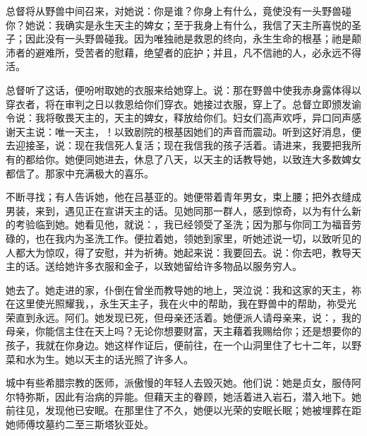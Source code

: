 总督将从野兽中间召来，对她说：你是谁？你身上有什么，竟使没有一头野兽碰你？她说：我确实是永生天主的婢女；至于我身上有什么，我信了天主所喜悦的圣子；因此没有一头野兽碰我。因为唯独祂是救恩的终向，永生生命的根基；祂是颠沛者的避难所，受苦者的慰藉，绝望者的庇护；并且，凡不信祂的人，必永远不得活。\par

总督听了这话，便吩咐取她的衣服来给她穿上。说：那在野兽中使我赤身露体得以穿衣者，将在审判之日以救恩给你们穿衣。她接过衣服，穿上了。总督立即颁发谕令说：我将敬畏天主的，天主的婢女，释放给你们。妇女们高声欢呼，异口同声感谢天主说：唯一天主，！以致剧院的根基因她们的声音而震动。听到这好消息，便去迎接圣，说：现在我信死人复活；现在我信我的孩子活着。请进来，我要把我所有的都给你。她便同她进去，休息了八天，以天主的话教导她，以致连大多数婢女都信了。那家中充满极大的喜乐。\par

不断寻找；有人告诉她，他在吕基亚的。她便带着青年男女，束上腰；把外衣缝成男装，来到，遇见正在宣讲天主的话。见她同那一群人，感到惊奇，以为有什么新的考验临到她。她看见他，就说：，我已经领受了圣洗；因为那与你同工为福音劳碌的，也在我内为圣洗工作。便拉着她，领她到家里，听她述说一切，以致听见的人都大为惊叹，得了安慰，并为祈祷。她起来说：我要回去。说：你去吧，教导天主的话。送给她许多衣服和金子，以致她留给许多物品以服务穷人。\par

她去了。她走进的家，仆倒在曾坐而教导她的地上，哭泣说：我和这家的天主，祢在这里使光照耀我，，永生天主子，我在火中的帮助，我在野兽中的帮助，祢受光荣直到永远。阿们。她发现已死，但母亲还活着。她便派人请母亲来，说：，我的母亲，你能信主住在天上吗？无论你想要财富，天主藉着我赐给你；还是想要你的孩子，我就在你身边。她这样作证后，便前往，在一个山洞里住了七十二年，以野菜和水为生。她以天主的话光照了许多人。\par

城中有些希腊宗教的医师，派傲慢的年轻人去毁灭她。他们说：她是贞女，服侍阿尔特弥斯，因此有治病的异能。但藉天主的眷顾，她活着进入岩石，潜入地下。她前往见，发现他已安眠。在那里住了不久，她便以光荣的安眠长眠；她被埋葬在距她师傅坟墓约二至三斯塔狄亚处。\par

